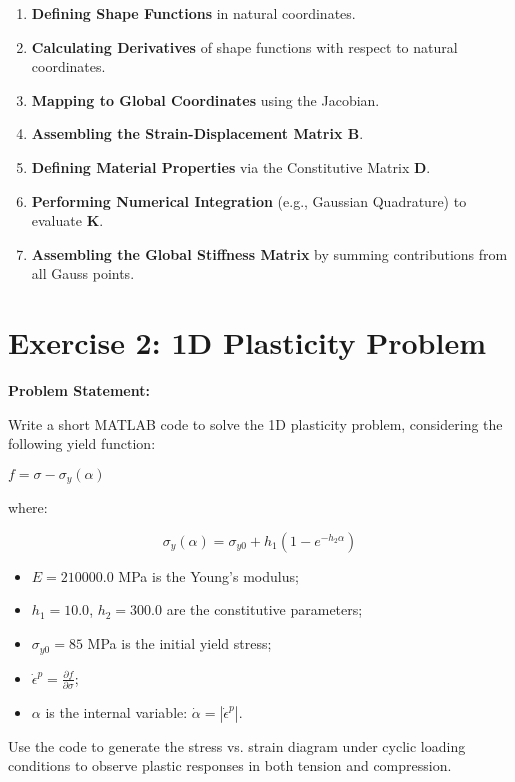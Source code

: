 \documentclass{article}
\begin{document}
\begin{enumerate}
    \item \textbf{Defining Shape Functions} in natural coordinates.
    \item \textbf{Calculating Derivatives} of shape functions with respect to natural coordinates.
    \item \textbf{Mapping to Global Coordinates} using the Jacobian.
    \item \textbf{Assembling the Strain-Displacement Matrix $ \mathbf{B} $}.
    \item \textbf{Defining Material Properties} via the Constitutive Matrix $ \mathbf{D} $.
    \item \textbf{Performing Numerical Integration} (e.g., Gaussian Quadrature) to evaluate $ \mathbf{K} $.
    \item \textbf{Assembling the Global Stiffness Matrix} by summing contributions from all Gauss points.
\end{enumerate}



\section{Exercise 2: 1D Plasticity Problem}

\textbf{Problem Statement:}

Write a short MATLAB code to solve the 1D plasticity problem, considering the following yield function:

$
f = \sigma - \sigma_y(\alpha)
$

where:

$$
\sigma_y(\alpha) = \sigma_{y0} + h_1 \left(1 - e^{-h_2 \alpha}\right)
$$

\begin{itemize}
    \item $ E = 210000.0 $ MPa is the Young’s modulus;
    \item $ h_1 = 10.0 $, $ h_2 = 300.0 $ are the constitutive parameters;
    \item $ \sigma_{y0} = 85 $ MPa is the initial yield stress;
    \item $ \dot{\epsilon}^p = \frac{\partial f}{\partial \sigma} $;
    \item $ \alpha $ is the internal variable: $ \dot{\alpha} = |\dot{\epsilon}^p| $.
\end{itemize}

Use the code to generate the stress vs. strain diagram under cyclic loading conditions to observe plastic responses in both tension and compression.
\end{document}
